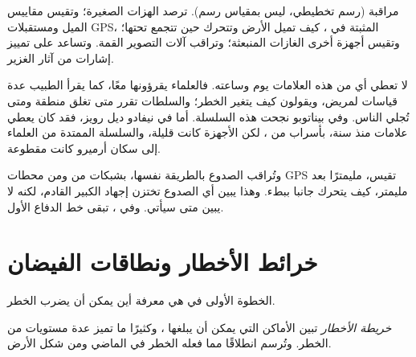 \begin{omfigure}
{\small مراقبة  (رسم تخطيطي، ليس بمقياس رسم). ترصد  الهزات
الصغيرة؛ وتقيس مقاييس الميل ومستقبلات GPS، المثبتة في ، كيف تميل الأرض
وتتحرك حين تتجمع  تحتها؛ وتقيس أجهزة أخرى الغازات المنبعثة؛ وتراقب آلات
التصوير القمة. وتساعد  على تمييز إشارات  من آثار 
الغزير.}
\label{fig:g9:natural-risks:monitoring}
\end{omfigure}

لا تعطي أي من هذه العلامات يوم  وساعته. فالعلماء يقرؤونها معًا، كما يقرأ
الطبيب عدة قياسات لمريض، ويقولون كيف يتغير الخطر؛ والسلطات تقرر متى تغلق منطقة
ومتى تُجلي الناس. وفي بيناتوبو نجحت هذه السلسلة. أما في نيفادو ديل رويز، فقد كان
 يعطي علامات منذ سنة، بأسراب من ، لكن الأجهزة كانت قليلة، والسلسلة
الممتدة من العلماء إلى سكان أرميرو كانت
مقطوعة.

وتُراقب الصدوع بالطريقة نفسها، بشبكات من  ومن محطات GPS تقيس،
مليمترًا بعد مليمتر، كيف يتحرك جانبا  ببطء. وهذا يبين أي الصدوع تختزن إجهاد
 الكبير القادم، لكنه لا يبين متى سيأتي. وفي ، تبقى  خط الدفاع
الأول.

\section{خرائط الأخطار ونطاقات الفيضان}

الخطوة الأولى في  هي معرفة أين يمكن أن يضرب الخطر.

\begin{definition}\label{def:g9:natural-risks:hazard-map}
\emph{خريطة الأخطار} تبين الأماكن التي يمكن أن يبلغها ، وكثيرًا ما تميز عدة مستويات من الخطر. وتُرسم انطلاقًا مما فعله الخطر في
الماضي ومن شكل الأرض.
\end{definition}

